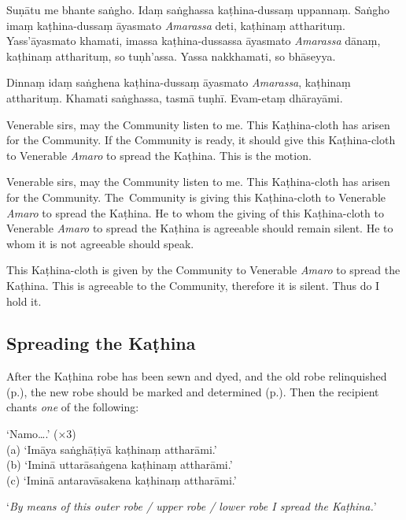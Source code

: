 Suṇātu me bhante saṅgho. Idaṃ saṅghassa kaṭhina-dussaṃ uppannaṃ. Saṅgho imaṃ
kaṭhina-dussaṃ āyasmato \emph{Amarassa} deti, kaṭhinaṃ attharituṃ.
Yass'āyasmato khamati, imassa kaṭhina-dussassa āyasmato \emph{Amarassa} dānaṃ,
kaṭhinaṃ attharituṃ, so tuṇh'assa. Yassa nakkhamati, so bhāseyya.

Dinnaṃ idaṃ saṅghena kaṭhina-dussaṃ āyasmato \emph{Amarassa}, kaṭhinaṃ
attharituṃ. Khamati saṅghassa, tasmā tuṇhī. Evam-etaṃ dhārayāmi.


\begin{english}
Venerable sirs, may the Community listen to me. This Kaṭhina-cloth has arisen
for the Community. If the Community is ready, it should give this Kaṭhina-cloth
to Venerable \emph{Amaro} to spread the Kaṭhina. This is the motion.

\bigskip

Venerable sirs, may the Community listen to me. This Kaṭhina-cloth has arisen
for the Community. The~Community is giving this Kaṭhina-cloth to Venerable
\emph{Amaro} to spread the Kaṭhina. He to whom the giving of this Kaṭhina-cloth
to Venerable \emph{Amaro} to spread the Kaṭhina is agreeable should remain
silent. He to whom it is not agreeable should speak.

\bigskip

This Kaṭhina-cloth is given by the Community to Venerable \emph{Amaro} to
spread the Kaṭhina. This is agreeable to the Community, therefore it is silent.
Thus do I hold it.
\end{english}

\subsection{Spreading the Kaṭhina}
\label{spreading-the-kathina}

After the Kaṭhina robe has been sewn and dyed, and the old robe relinquished
(p.\pageref{relinquish-robe}), the new robe should be marked and determined
(p.\pageref{determine-robe}). Then the recipient chants \emph{one} of the
following:

‘Namo….’ (×3)\\
(a) ‘Imāya saṅghāṭiyā kaṭhinaṃ attharāmi.’\\
(b) ‘Iminā uttarāsaṅgena kaṭhinaṃ attharāmi.’\\
(c) ‘Iminā antaravāsakena kaṭhinaṃ attharāmi.’

‘\emph{By means of this outer robe / upper robe / lower robe I spread the Kaṭhina.}’

